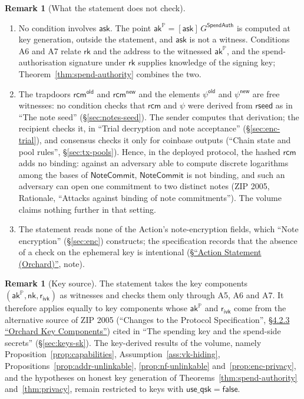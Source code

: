 \documentclass[11pt,a4paper]{article}
\theoremstyle{definition}
\newtheorem{remark}[theorem]{Remark}
\newcommand{\PP}{\mathbb{P}}
\newcommand{\rk}{\mathsf{rk}}
\newcommand{\NoteCommit}{\ensuremath{\mathsf{NoteCommit}}}
\newcommand{\ask}{\ensuremath{\mathsf{ask}}}
\newcommand{\aksym}{\ensuremath{\mathsf{ak}}}
\newcommand{\nksym}{\ensuremath{\mathsf{nk}}}
\newcommand{\rcm}{\ensuremath{\mathsf{rcm}}}
\newcommand{\rivk}{\ensuremath{\mathsf{r_{ivk}}}}
\begin{document}
\begin{remark}[What the statement does not check]
\leavevmode
\begin{enumerate}
\item[(i)] No condition involves $\ask$. The point
  $\aksym^{\PP} = [\ask]\,G^{\mathsf{SpendAuth}}$ is computed at key
  generation, outside the statement, and $\ask$ is not a witness. Conditions
  A6 and A7 relate $\rk$ and the address to the witnessed $\aksym^{\PP}$, and
  the spend-authorisation signature under $\rk$ supplies knowledge of the
  signing key; Theorem~\ref{thm:spend-authority} combines the two.
\item[(ii)] The trapdoors $\rcm^{\mathsf{old}}$ and $\rcm^{\mathsf{new}}$ and
  the elements $\psi^{\mathsf{old}}$ and $\psi^{\mathsf{new}}$ are free
  witnesses: no condition checks that $\rcm$ and $\psi$ were derived from
  $\mathsf{rseed}$ as in ``The note seed'' (\S\ref{sec:notes-seed}). The
  sender computes that derivation; the recipient checks it, in ``Trial
  decryption and note acceptance'' (\S\ref{sec:enc-trial}), and consensus
  checks it only for coinbase outputs (``Chain state and pool rules'',
  \S\ref{sec:tx-pools}). Hence, in the deployed protocol, the hashed $\rcm$
  adds no binding: against an adversary able to compute discrete logarithms
  among the bases of $\NoteCommit$, $\NoteCommit$ is not binding, and such an
  adversary can open one commitment to two distinct notes (ZIP 2005,
  Rationale, ``Attacks against binding of note commitments''). The volume
  claims nothing further in that setting.
\item[(iii)] The statement reads none of the Action's note-encryption fields,
  which ``Note encryption'' (\S\ref{sec:enc}) constructs; the specification
  records that the absence of a check on the ephemeral key is intentional
  (\href{https://zips.z.cash/protocol/protocol.pdf#actionstatement}%
  {\S``Action Statement (Orchard)''}, note).
\end{enumerate}
\end{remark}

\begin{remark}[Key source]
The statement takes the key components $(\aksym^{\PP}, \nksym, \rivk)$ as
witnesses and checks them only through A5, A6 and A7. It therefore applies
equally to key components whose $\aksym^{\PP}$ and $\rivk$ come from the
alternative source of ZIP 2005 (``Changes to the Protocol Specification'',
\href{https://zips.z.cash/zip-2005#\%C2\%A74.2.3\%E2\%80\%98orchardkeycomponents\%E2\%80\%99}%
{\S 4.2.3 ``Orchard Key Components''}) cited in ``The spending key and the
spend-side secrets'' (\S\ref{sec:keys-sk}). The key-derived results of the
volume, namely Proposition~\ref{prop:capabilities},
Assumption~\ref{ass:vk-hiding}, Propositions~\ref{prop:addr-unlinkable},
\ref{prop:nf-unlinkable} and~\ref{prop:enc-privacy}, and the hypotheses on
honest key generation of Theorems~\ref{thm:spend-authority}
and~\ref{thm:privacy}, remain restricted to keys with
$\mathsf{use\_qsk} = \mathsf{false}$.
\end{remark}
\end{document}
